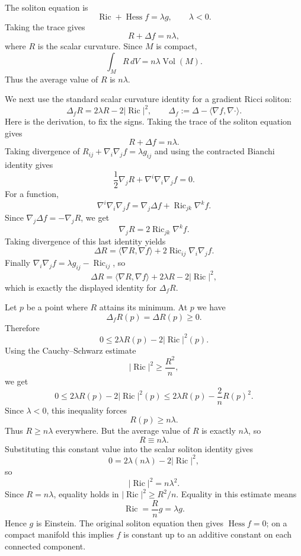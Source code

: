 \begin{solution}
The soliton equation is
\[
    \operatorname{Ric}+\operatorname{Hess}f=\lambda g,
    \qquad \lambda<0.
\]
Taking the trace gives
\[
    R+\Delta f=n\lambda,
\]
where $R$ is the scalar curvature. Since $M$ is compact,
\[
    \int_M R\,dV=n\lambda\operatorname{Vol}(M).
\]
Thus the average value of $R$ is $n\lambda$.

We next use the standard scalar curvature identity for a gradient Ricci soliton:
\[
    \Delta_f R=2\lambda R-2|\operatorname{Ric}|^2,
    \qquad
    \Delta_f:=\Delta-\langle\nabla f,\nabla\cdot\rangle.
\]
Here is the derivation, to fix the signs. Taking the trace of the soliton
equation gives
\[
    R+\Delta f=n\lambda.
\]
Taking divergence of
$R_{ij}+\nabla_i\nabla_j f=\lambda g_{ij}$ and using the contracted Bianchi
identity gives
\[
    \frac12\nabla_jR+\nabla^i\nabla_i\nabla_j f=0.
\]
For a function,
\[
    \nabla^i\nabla_i\nabla_j f
    =
    \nabla_j\Delta f+\operatorname{Ric}_{jk}\nabla^k f.
\]
Since $\nabla_j\Delta f=-\nabla_jR$, we get
\[
    \nabla_jR=2\operatorname{Ric}_{jk}\nabla^k f.
\]
Taking divergence of this last identity yields
\[
    \Delta R
    =
    \langle\nabla R,\nabla f\rangle
    +2\operatorname{Ric}_{ij}\nabla_i\nabla_jf.
\]
Finally $\nabla_i\nabla_jf=\lambda g_{ij}-\operatorname{Ric}_{ij}$, so
\[
    \Delta R
    =
    \langle\nabla R,\nabla f\rangle
    +2\lambda R-2|\operatorname{Ric}|^2,
\]
which is exactly the displayed identity for $\Delta_fR$.

Let $p$ be a point where $R$ attains its minimum. At $p$ we have
\[
    \Delta_f R(p)=\Delta R(p)\geq 0.
\]
Therefore
\[
    0\leq 2\lambda R(p)-2|\operatorname{Ric}|^2(p).
\]
Using the Cauchy--Schwarz estimate
\[
    |\operatorname{Ric}|^2\geq \frac{R^2}{n},
\]
we get
\[
    0
    \leq
    2\lambda R(p)-2|\operatorname{Ric}|^2(p)
    \leq
    2\lambda R(p)-\frac{2}{n}R(p)^2.
\]
Since $\lambda<0$, this inequality forces
\[
    R(p)\geq n\lambda.
\]
Thus $R\geq n\lambda$ everywhere. But the average value of $R$ is exactly
$n\lambda$, so
\[
    R\equiv n\lambda.
\]
Substituting this constant value into the scalar soliton identity gives
\[
    0=2\lambda(n\lambda)-2|\operatorname{Ric}|^2,
\]
so
\[
    |\operatorname{Ric}|^2=n\lambda^2.
\]
Since $R=n\lambda$, equality holds in
$|\operatorname{Ric}|^2\geq R^2/n$. Equality in this estimate means
\[
    \operatorname{Ric}=\frac{R}{n}g=\lambda g.
\]
Hence $g$ is Einstein. The original soliton equation then gives
$\operatorname{Hess}f=0$; on a compact manifold this implies $f$ is constant up to
an additive constant on each connected component.
\end{solution}
